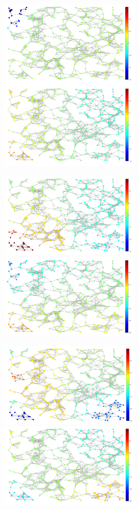 \documentclass[a4paper]{article}
\begin{document}
\begin{figure}[H]
\centering
\includegraphics[width = 7cm]{interpolation/interpolate_2nd_eigen}
\includegraphics[width = 7cm]{interpolation/original_2nd_eigen}

\includegraphics[width = 7cm]{interpolation/interpolate_3rd_eigen}
\includegraphics[width = 7cm]{interpolation/original_3rd_eigen}

\includegraphics[width = 7cm]{interpolation/interpolate_4th_eigen}
\includegraphics[width = 7cm]{interpolation/original_4th_eigen}


\end{figure}
\end{document}
